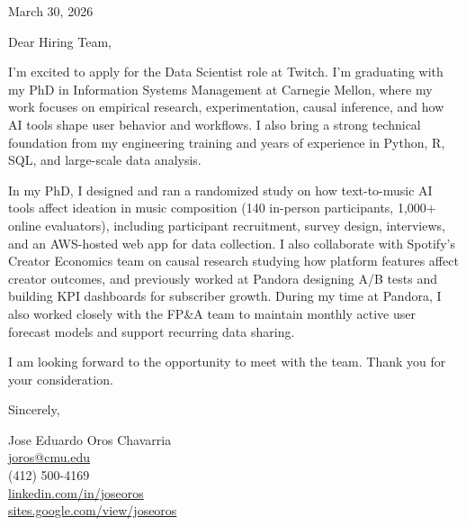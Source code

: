\documentclass[11pt,letterpaper]{article}
\begin{document}
\hfill March 30, 2026

Dear Hiring Team,

I'm excited to apply for the Data Scientist role at Twitch. I'm graduating with my PhD in Information Systems Management at Carnegie Mellon, where my work focuses on empirical research, experimentation, causal inference, and how AI tools shape user behavior and workflows. I also bring a strong technical foundation from my engineering training and years of experience in Python, R, SQL, and large-scale data analysis.

In my PhD, I designed and ran a randomized study on how text-to-music AI tools affect ideation in music composition (140 in-person participants, 1,000+ online evaluators), including participant recruitment, survey design, interviews, and an AWS-hosted web app for data collection. I also collaborate with Spotify's Creator Economics team on causal research studying how platform features affect creator outcomes, and previously worked at Pandora designing A/B tests and building KPI dashboards for subscriber growth. During my time at Pandora, I also worked closely with the FP\&A team to maintain monthly active user forecast models and support recurring data sharing.

I am looking forward to the opportunity to meet with the team. Thank you for your consideration.

Sincerely,

Jose Eduardo Oros Chavarria \\
\href{mailto:joros@cmu.edu}{joros@cmu.edu} \\
(412) 500-4169 \\
\href{https://www.linkedin.com/in/joseoros}{linkedin.com/in/joseoros} \\
\href{https://sites.google.com/view/joseoros}{sites.google.com/view/joseoros}
\end{document}
